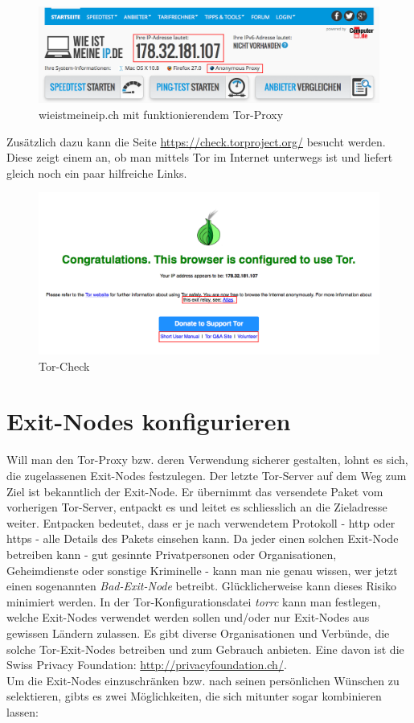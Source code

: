 \begin{figure}[H]
\centering
\includegraphics[scale=0.4]{images/wieistmeineip}
\caption{wieistmeineip.ch mit funktionierendem Tor-Proxy}
\end{figure}

Zusätzlich dazu kann die Seite \url{https://check.torproject.org/} besucht werden. Diese zeigt einem an, ob man mittels Tor im Internet unterwegs ist und liefert gleich noch ein paar hilfreiche Links.

\begin{figure}[H]
\centering
\includegraphics[scale=0.4]{images/torcheck}
\caption{Tor-Check}
\end{figure}

\section{Exit-Nodes konfigurieren}
Will man den Tor-Proxy bzw. deren Verwendung sicherer gestalten, lohnt es sich, die zugelassenen Exit-Nodes festzulegen. Der letzte Tor-Server auf dem Weg zum Ziel ist bekanntlich der Exit-Node. Er übernimmt das versendete Paket vom vorherigen Tor-Server, entpackt es und leitet es schliesslich an die Zieladresse weiter. Entpacken bedeutet, dass er je nach verwendetem Protokoll - http oder https - alle Details des Pakets einsehen kann. Da jeder einen solchen Exit-Node betreiben kann - gut gesinnte Privatpersonen oder Organisationen, Geheimdienste oder sonstige Kriminelle - kann man nie genau wissen, wer jetzt einen sogenannten \textit{Bad-Exit-Node} betreibt. Glücklicherweise kann dieses Risiko minimiert werden. In der Tor-Konfigurationsdatei \textit{torrc} kann man festlegen, welche Exit-Nodes verwendet werden sollen und/oder nur Exit-Nodes aus gewissen Ländern zulassen. Es gibt diverse Organisationen und Verbünde, die solche Tor-Exit-Nodes betreiben und zum Gebrauch anbieten. Eine davon ist die Swiss Privacy Foundation: \url{http://privacyfoundation.ch/}.
\\
Um die Exit-Nodes einzuschränken bzw. nach seinen persönlichen Wünschen zu selektieren, gibts es zwei Möglichkeiten, die sich mitunter sogar kombinieren lassen: 

